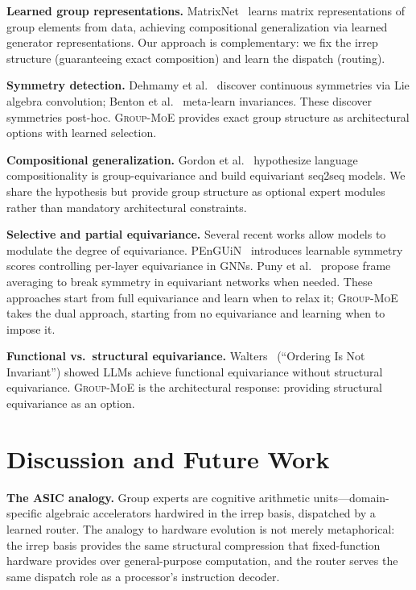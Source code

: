\documentclass[10pt, letterpaper]{article}
\newcommand{\gmoe}{\textsc{Group-MoE}}
\begin{document}
\textbf{Learned group representations.} MatrixNet~\cite{laird2024matrixnet} learns matrix representations of group elements from data, achieving compositional generalization via learned generator representations. Our approach is complementary: we fix the irrep structure (guaranteeing exact composition) and learn the dispatch (routing).

\textbf{Symmetry detection.} Dehmamy et al.~\cite{dehmamy2021automatic} discover continuous symmetries via Lie algebra convolution; Benton et al.~\cite{benton2020learning} meta-learn invariances. These discover symmetries post-hoc. \gmoe{} provides exact group structure as architectural options with learned selection.

\textbf{Compositional generalization.} Gordon et al.~\cite{gordon2020permutation} hypothesize language compositionality is group-equivariance and build equivariant seq2seq models. We share the hypothesis but provide group structure as optional expert modules rather than mandatory architectural constraints.

\textbf{Selective and partial equivariance.} Several recent works allow models to modulate the degree of equivariance. PEnGUiN~\cite{penguin2025} introduces learnable symmetry scores controlling per-layer equivariance in GNNs. Puny et al.~\cite{puny2022frame} propose frame averaging to break symmetry in equivariant networks when needed. These approaches start from full equivariance and learn when to relax it; \gmoe{} takes the dual approach, starting from no equivariance and learning when to impose it.

\textbf{Functional vs.\ structural equivariance.} Walters~\cite{walters2025ordering} (``Ordering Is Not Invariant'') showed LLMs achieve functional equivariance without structural equivariance. \gmoe{} is the architectural response: providing structural equivariance as an option.

\section{Discussion and Future Work}
\label{sec:discussion}

\textbf{The ASIC analogy.} Group experts are cognitive arithmetic units---domain-specific algebraic accelerators hardwired in the irrep basis, dispatched by a learned router. The analogy to hardware evolution is not merely metaphorical: the irrep basis provides the same structural compression that fixed-function hardware provides over general-purpose computation, and the router serves the same dispatch role as a processor's instruction decoder.
\end{document}
